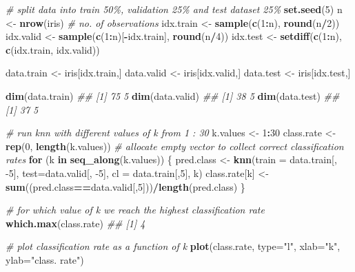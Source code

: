 \documentclass[
]{book}
\newenvironment{Shaded}{\begin{snugshade}}{\end{snugshade}}
\newcommand{\CommentTok}[1]{\textcolor[rgb]{0.56,0.35,0.01}{\textit{#1}}}
\newcommand{\ControlFlowTok}[1]{\textcolor[rgb]{0.13,0.29,0.53}{\textbf{#1}}}
\newcommand{\DataTypeTok}[1]{\textcolor[rgb]{0.13,0.29,0.53}{#1}}
\newcommand{\DecValTok}[1]{\textcolor[rgb]{0.00,0.00,0.81}{#1}}
\newcommand{\KeywordTok}[1]{\textcolor[rgb]{0.13,0.29,0.53}{\textbf{#1}}}
\newcommand{\NormalTok}[1]{#1}
\newcommand{\OperatorTok}[1]{\textcolor[rgb]{0.81,0.36,0.00}{\textbf{#1}}}
\newcommand{\StringTok}[1]{\textcolor[rgb]{0.31,0.60,0.02}{#1}}
\theoremstyle{definition}
\theoremstyle{definition}
\theoremstyle{definition}
\theoremstyle{remark}
\begin{document}
\begin{Shaded}
\begin{Highlighting}[]
\CommentTok{\# split data into train 50\%, validation 25\% and test dataset 25\%}
\KeywordTok{set.seed}\NormalTok{(}\DecValTok{5}\NormalTok{)}
\NormalTok{n \textless{}{-}}\StringTok{ }\KeywordTok{nrow}\NormalTok{(iris) }\CommentTok{\# no. of observations}
\NormalTok{idx.train \textless{}{-}}\StringTok{ }\KeywordTok{sample}\NormalTok{(}\KeywordTok{c}\NormalTok{(}\DecValTok{1}\OperatorTok{:}\NormalTok{n), }\KeywordTok{round}\NormalTok{(n}\OperatorTok{/}\DecValTok{2}\NormalTok{))}
\NormalTok{idx.valid \textless{}{-}}\StringTok{ }\KeywordTok{sample}\NormalTok{(}\KeywordTok{c}\NormalTok{(}\DecValTok{1}\OperatorTok{:}\NormalTok{n)[}\OperatorTok{{-}}\NormalTok{idx.train], }\KeywordTok{round}\NormalTok{(n}\OperatorTok{/}\DecValTok{4}\NormalTok{))}
\NormalTok{idx.test \textless{}{-}}\StringTok{ }\KeywordTok{setdiff}\NormalTok{(}\KeywordTok{c}\NormalTok{(}\DecValTok{1}\OperatorTok{:}\NormalTok{n), }\KeywordTok{c}\NormalTok{(idx.train, idx.valid))}

\NormalTok{data.train \textless{}{-}}\StringTok{ }\NormalTok{iris[idx.train,]}
\NormalTok{data.valid \textless{}{-}}\StringTok{ }\NormalTok{iris[idx.valid,]}
\NormalTok{data.test \textless{}{-}}\StringTok{ }\NormalTok{iris[idx.test,]}

\KeywordTok{dim}\NormalTok{(data.train)}
\CommentTok{\#\# [1] 75  5}
\KeywordTok{dim}\NormalTok{(data.valid)}
\CommentTok{\#\# [1] 38  5}
\KeywordTok{dim}\NormalTok{(data.test)}
\CommentTok{\#\# [1] 37  5}

\CommentTok{\# run knn with different values of k from 1 : 30}
\NormalTok{k.values \textless{}{-}}\StringTok{ }\DecValTok{1}\OperatorTok{:}\DecValTok{30}
\NormalTok{class.rate \textless{}{-}}\StringTok{ }\KeywordTok{rep}\NormalTok{(}\DecValTok{0}\NormalTok{, }\KeywordTok{length}\NormalTok{(k.values)) }\CommentTok{\# allocate empty vector to collect correct classification rates}
\ControlFlowTok{for}\NormalTok{ (k }\ControlFlowTok{in} \KeywordTok{seq\_along}\NormalTok{(k.values))}
\NormalTok{\{}
\NormalTok{  pred.class \textless{}{-}}\StringTok{ }\KeywordTok{knn}\NormalTok{(}\DataTypeTok{train =}\NormalTok{ data.train[, }\DecValTok{{-}5}\NormalTok{], }\DataTypeTok{test=}\NormalTok{data.valid[, }\DecValTok{{-}5}\NormalTok{], }\DataTypeTok{cl =}\NormalTok{ data.train[,}\DecValTok{5}\NormalTok{], k)}
\NormalTok{  class.rate[k] \textless{}{-}}\StringTok{ }\KeywordTok{sum}\NormalTok{((pred.class}\OperatorTok{==}\NormalTok{data.valid[,}\DecValTok{5}\NormalTok{]))}\OperatorTok{/}\KeywordTok{length}\NormalTok{(pred.class)}
\NormalTok{\}}

\CommentTok{\# for which value of k we reach the highest classification rate}
\KeywordTok{which.max}\NormalTok{(class.rate)}
\CommentTok{\#\# [1] 4}

\CommentTok{\# plot classification rate as a function of k}
\KeywordTok{plot}\NormalTok{(class.rate, }\DataTypeTok{type=}\StringTok{"l"}\NormalTok{, }\DataTypeTok{xlab=}\StringTok{"k"}\NormalTok{, }\DataTypeTok{ylab=}\StringTok{"class. rate"}\NormalTok{)}
\end{Highlighting}
\end{Shaded}
\end{document}

